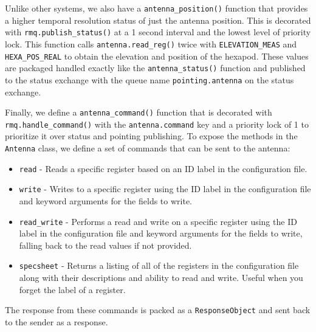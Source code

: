 Unlike other systems, we also have a \texttt{antenna\_position()} function that provides a higher temporal resolution status of just the antenna position.
This is decorated with \texttt{rmq.publish\_status()} at a 1 second interval and the lowest level of priority lock.
This function calls \texttt{antenna.read\_reg()} twice with \texttt{ELEVATION\_MEAS} and \texttt{HEXA\_POS\_REAL} to obtain the elevation and position of the hexapod. 
These values are packaged handled exactly like the \texttt{antenna\_status()} function and published to the status exchange with the queue name \texttt{pointing.antenna} on the status exchange.

Finally, we define a \texttt{antenna\_command()} function that is decorated with \texttt{rmq.handle\_command()} with the \texttt{antenna.command} key and a priority lock of 1 to prioritize it over status and pointing publishing. 
To expose the methods in the \texttt{Antenna} class, we define a set of commands that can be sent to the antenna: 
\begin{itemize}
    \item \texttt{read} - Reads a specific register based on an ID label in the configuration file.
    \item \texttt{write} - Writes to a specific register using the ID label in the configuration file and keyword arguments for the fields to write.
    \item \texttt{read\_write} - Performs a read and write on a specific register using the ID label in the configuration file and keyword arguments for the fields to write, falling back to the read values if not provided.
    \item \texttt{specsheet} - Returns a listing of all of the registers in the configuration file along with their descriptions and ability to read and write. Useful when you forget the label of a register.
\end{itemize}
The response from these commands is packed as a \texttt{ResponseObject} and sent back to the sender as a response.

